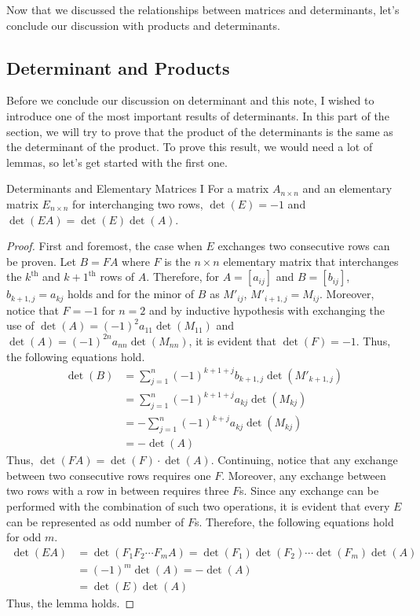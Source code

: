 \documentclass[../main.tex]{subfiles}
\begin{document}
Now that we discussed the relationships between matrices and
determinants, let's conclude our discussion with products and
determinants.

\subsection{Determinant and Products}

Before we conclude our discussion on determinant and this note,
I wished to introduce one of the most important results of
determinants. In this part of the section, we will try to prove
that the product of the determinants is the same as the determinant
of the product. To prove this result, we would need a lot of lemmas,
so let's get started with the first one.

\begin{lemma}{Determinants and Elementary Matrices I}
For a matrix $A_{n \times n}$ and an elementary matrix
$E_{n \times n}$ for interchanging two rows, $\det(E) = -1$
and $\det(EA) = \det(E) \det(A)$.
\end{lemma}
\begin{proof}
First and foremost, the case when $E$ exchanges two consecutive
rows can be proven. Let $B = FA$ where $F$ is the $n \times n$
elementary matrix that interchanges the $k^\text{th}$ and
$k+1^\text{th}$ rows of $A$. Therefore, for $A = [a_{ij}]$ and
$B = [b_{ij}]$, $b_{k+1,j} = a_{kj}$ holds and for the minor of $B$ as
$M'_{ij}$, $M'_{i+1,j} = M_{ij}$. Moreover, notice that $F = -1$ for
$n = 2$ and by inductive hypothesis with exchanging the use of
$\det(A) = (-1)^2 a_{11} \det(M_{11})$ and $\det(A) = (-1)^{2n} a_{nn}
\det(M_{nn})$, it is evident that $\det(F) = -1$. Thus, the following
equations hold.
\begin{align*}
    \det(B)
    &= \sum_{j=1}^n (-1)^{k+1+j} b_{k+1,j} \det(M'_{k+1,j}) \\
    &= \sum_{j=1}^n (-1)^{k+1+j} a_{kj} \det(M_{kj}) \\
    &= -\sum_{j=1}^n (-1)^{k+j} a_{kj} \det(M_{kj}) \\
    &= -\det(A)
\end{align*}
Thus, $\det(FA) = \det(F) \cdot \det(A)$. Continuing, notice that
any exchange between two consecutive rows requires one $F$. Moreover,
any exchange between two rows with a row in between requires three
$F$s. Since any exchange can be performed with the combination of
such two operations, it is evident that every $E$ can be represented
as odd number of $F$s. Therefore, the following equations hold for
odd $m$.
\begin{align*}
    \det(EA)
    &= \det(F_1 F_2 \cdots F_m A)
    = \det(F_1) \det(F_2) \cdots \det(F_m) \det(A) \\
    &= (-1)^m \det(A)
    = -\det(A) \\
    &= \det(E) \det(A)
\end{align*}
Thus, the lemma holds.
\end{proof}
\end{document}
